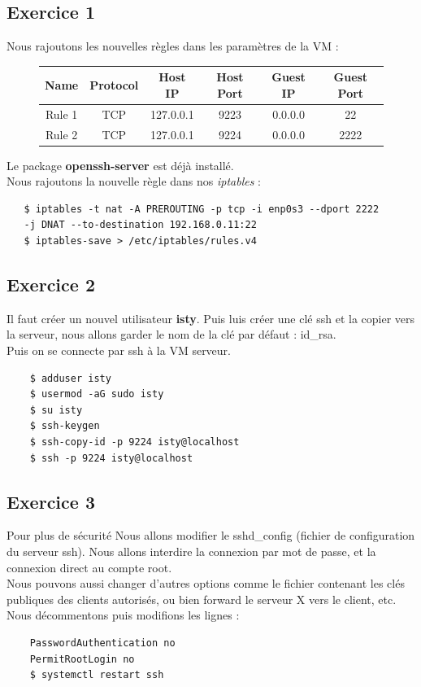\documentclass{report}
\begin{document}
\subsection{Exercice 1}
Nous rajoutons les nouvelles règles dans les paramètres de la VM :
\begin{figure}[!htp]
  \begin{tabular}{|c|c|c|c|c|c|}
      \hline
     Name & Protocol & Host IP & Host Port & Guest IP & Guest Port \\
     \hline
     Rule 1 & TCP & 127.0.0.1 & 9223 & 0.0.0.0 & 22 \\
     \hline
     Rule 2 & TCP & 127.0.0.1 & 9224 & 0.0.0.0 & 2222 \\
     \hline
  \end{tabular}
\end{figure}

Le package \textbf{openssh-server} est déjà installé.\\
Nous rajoutons la nouvelle règle dans nos \textit{iptables} :
\begin{tcolorbox}
  \begin{verbatim}
   $ iptables -t nat -A PREROUTING -p tcp -i enp0s3 --dport 2222
   -j DNAT --to-destination 192.168.0.11:22
   $ iptables-save > /etc/iptables/rules.v4
  \end{verbatim}
\end{tcolorbox}

\subsection{Exercice 2}
Il faut créer un nouvel utilisateur \textbf{isty}. Puis luis créer une clé ssh et la copier vers
la serveur, nous allons garder le nom de la clé par défaut : id\_rsa. \\
Puis on se connecte par ssh à la VM serveur.
\begin{tcolorbox}
  \begin{verbatim}
    $ adduser isty
    $ usermod -aG sudo isty
    $ su isty
    $ ssh-keygen
    $ ssh-copy-id -p 9224 isty@localhost
    $ ssh -p 9224 isty@localhost
  \end{verbatim}
\end{tcolorbox}

\subsection{Exercice 3}
Pour plus de sécurité Nous allons modifier le sshd\_config (fichier de configuration du serveur ssh).
Nous allons interdire la connexion par mot de passe, et la connexion direct au compte root. \\
Nous pouvons aussi changer d'autres options comme le fichier contenant les clés publiques des clients
autorisés, ou bien forward le serveur X vers le client, etc.\\
Nous décommentons puis modifions les lignes :
\begin{tcolorbox}
  \begin{verbatim}
    PasswordAuthentication no
    PermitRootLogin no
    $ systemctl restart ssh
  \end{verbatim}
\end{tcolorbox}
\end{document}
